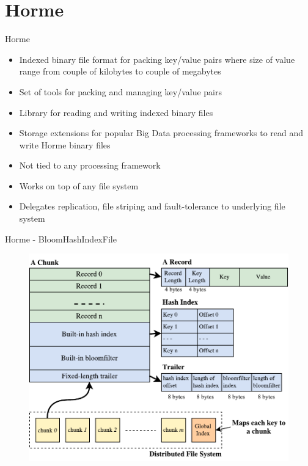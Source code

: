 \documentclass[newPxFont]{beamer}
\begin{document}
\section{Horme}

\begin{frame}[c]{Horme}
\begin{itemize}
  \item Indexed binary file format for packing key/value pairs where size of value range from couple of kilobytes to couple of megabytes
  \item Set of tools for packing and managing key/value pairs  
  \item Library for reading and writing indexed binary files 
  \item Storage extensions for popular Big Data processing frameworks to read and write Horme binary files
  \item Not tied to any processing framework
  \item Works on top of any file system
  \item Delegates replication, file striping and fault-tolerance to underlying file system
\end{itemize}
\end{frame}

\begin{frame}[c]{Horme - BloomHashIndexFile}
\begin{figure}[t]
  \includegraphics[scale=0.6]{horme-2}
  \centering
\end{figure}  
\end{frame}
\end{document}
